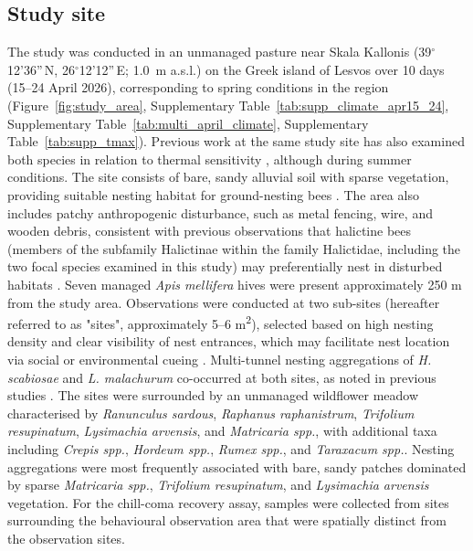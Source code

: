 \documentclass[11pt,a4paper]{article}
\begin{document}
\subsection{Study site}

The study was conducted in an unmanaged pasture near Skala Kallonis (39$^\circ$12'36''\,N, 26$^\circ$12'12''\,E; 1.0~m a.s.l.) on the Greek island of Lesvos over 10 days (15--24 April 2026), corresponding to spring conditions in the region (Figure~\ref{fig:study_area}, Supplementary Table~\ref{tab:supp_climate_apr15_24}, Supplementary Table~\ref{tab:multi_april_climate}, Supplementary Table~\ref{tab:supp_tmax}). Previous work at the same study site has also examined both species in relation to thermal sensitivity \citep{Gonzalez2020a}, although during summer conditions. The site consists of bare, sandy alluvial soil with sparse vegetation, providing suitable nesting habitat for ground-nesting bees \citep{Wuellner1999, Potts1997, Wesserling1995, Gregory2005, Severns2004}. The area also includes patchy anthropogenic disturbance, such as metal fencing, wire, and wooden debris, consistent with previous observations that halictine bees (members of the subfamily Halictinae within the family Halictidae, including the two focal species examined in this study) may preferentially nest in disturbed habitats \citep{Batra1966}. Seven managed \textit{Apis mellifera} hives were present approximately 250 m from the study area. Observations were conducted at two sub-sites (hereafter referred to as "sites", approximately 5–6 m\textsuperscript{2}), selected based on high nesting density and clear visibility of nest entrances, which may facilitate nest location via social or environmental cueing \citep{Potts1997, Michener2007}. Multi-tunnel nesting aggregations of \textit{H. scabiosae} and \textit{L. malachurum} co-occurred at both sites, as noted in previous studies \citep{Polidori2010, Antoine2021, Gonzalez2018}. The sites were surrounded by an unmanaged wildflower meadow characterised by \textit{Ranunculus sardous}, \textit{Raphanus raphanistrum}, \textit{Trifolium resupinatum}, \textit{Lysimachia arvensis}, and \textit{Matricaria spp.}, with additional taxa including \textit{Crepis spp.}, \textit{Hordeum spp.}, \textit{Rumex spp.}, and \textit{Taraxacum spp.}. Nesting aggregations were most frequently associated with bare, sandy patches dominated by sparse \textit{Matricaria spp.}, \textit{Trifolium resupinatum}, and \textit{Lysimachia arvensis} vegetation. For the chill-coma recovery assay, samples were collected from sites surrounding the behavioural observation area that were spatially distinct from the observation sites.
\end{document}
